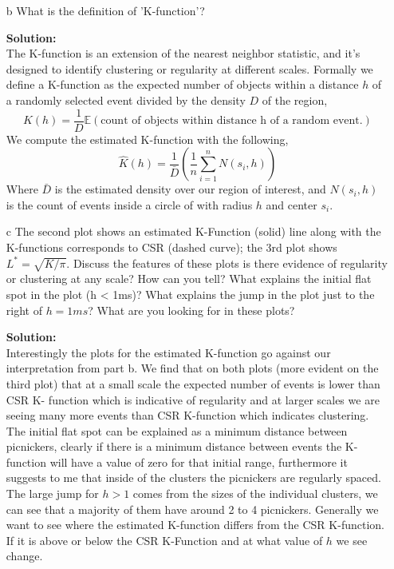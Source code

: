 \documentclass[12pt]{article}
\makeatletter
\theoremstyle{homework}
\newenvironment{exercise}[1]
{\def\@currentlabel{#1}\exercisecore}
{\endexercisecore}
\newcommand{\localhead}[1]{\par\smallskip\noindent\textbf{#1}\nobreak\\}%
\newcommand\solution{\localhead{Solution:}}
\makeatother
\begin{document}
\begin{exercise}{5}
\begin{enumerate}
    
    \item[b] What is the definition of 'K-function'?\\
    \solution The K-function is an extension of the nearest neighbor statistic, and it's designed to identify clustering or regularity at different scales. Formally we define a K-function as 
    the expected number of objects within a distance $h$ of a randomly selected event divided by the density $D$ of the region, 
    \begin{equation*}
      K(h) = \dfrac{1}{D} \mathbb{E}\left(\text{count of objects within distance h of a random event.}\right)
    \end{equation*}
    We compute the estimated K-function with the following,  
    \begin{equation*}
      \hat{K}(h) = \dfrac{1}{\bar{D}} \left(\dfrac{1}{n} \sum_{i = 1}^n N(s_i, h)\right)
    \end{equation*}
    Where $\bar{D}$ is the estimated density over our region of interest, and $N(s_i, h)$ is the count of events inside a circle of with radius $h$ and center $s_i$.
    \vspace{.15in}
    
    
    \item[c] The second plot shows an estimated K-Function (solid) line along with the K-functions corresponds to CSR (dashed curve); the 3rd plot shows $L^* = \sqrt{K/\pi}$. Discuss 
    the features of these plots is there evidence of regularity or clustering at any scale? How can you tell? What explains the initial flat spot in the plot (h < 1ms)? What explains the jump in the plot just to the right of 
    $h = 1ms$? What are you looking for in these plots?\\
    \solution Interestingly the plots for the estimated K-function go against our interpretation from part b. We find that on both plots (more evident on the third plot) that at a small scale the expected number of events is lower than 
    CSR K- function which is indicative of regularity and at larger scales we are seeing many more events than CSR K-function which indicates clustering. The initial flat spot can be explained as a minimum distance between picnickers, clearly if there 
    is a minimum distance between events the K-function will have a value of zero for that initial range, furthermore it suggests to me that inside of the clusters the picnickers are regularly spaced. The large jump for $h > 1$ comes from the sizes of the individual clusters, 
    we can see that a majority of them have around 2 to 4 picnickers. Generally we want to see where the estimated K-function differs from the CSR K-function. If it is above or below the CSR K-Function and at what value of $h$ we see change.
    \vspace{.15in}

  \end{enumerate} 
  
\end{exercise}
\end{document}
